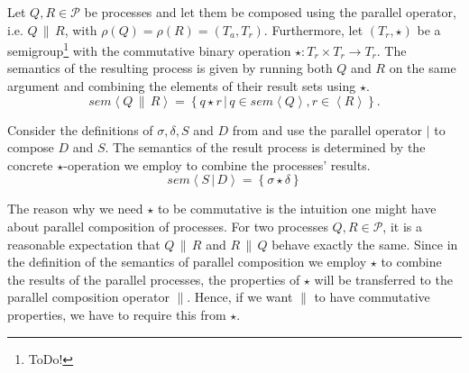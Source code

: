 \begin{definition}
\label{def:sem_parallel}
Let $Q, R \in \mathcal{P}$ be processes and let them be composed using the parallel operator, i.e. $Q \,\parallel\, R$, with $\rho \left( Q \right) = \rho \left( R \right) = \left( T_a, T_r \right)$. Furthermore, let $\left( T_r, \star \right)$ be a semigroup\footnote{ToDo!} with the commutative binary operation $\star \colon T_r \times T_r \to T_r$. The semantics of the resulting process is given by running both $Q$ and $R$ on the same argument and combining the elements of their result sets using $\star$.
  \begin{equation}
    \label{eqn:sem_parallel}
    sem \left\langle Q \,\parallel\, R \right\rangle = \left\{ q \star r \,|\, q \in sem \left\langle Q \right\rangle, r \in \left\langle R \right\rangle \right\}.
  \end{equation}
  \hfill\qedsymbol
\end{definition}



\begin{example}
\label{exp:sem_parallel}
Consider the definitions of $\sigma, \delta, S$ and $D$ from  and use the parallel operator $|$ to compose $D$ and $S$. The semantics of the result process is determined by the concrete $\star$-operation we employ to combine the processes' results.
  \begin{equation}
    sem \left\langle S \,|\, D \right\rangle = \left\{ \sigma \star \delta \right\}
  \end{equation}
  \hfill\qedsymbol
\end{example}

The reason why we need $\star$ to be commutative is the intuition one might have about parallel composition of processes. For two processes $Q, R \in \mathcal{P}$, it is a reasonable expectation that $Q \,\parallel\, R$ and $R \,\parallel\, Q$ behave exactly the same. Since in the definition of the semantics of parallel composition we employ $\star$ to combine the results of the parallel processes, the properties of $\star$ will be transferred to the parallel composition operator $\parallel$. Hence, if we want $\parallel$ to have commutative properties, we have to require this from $\star$.

